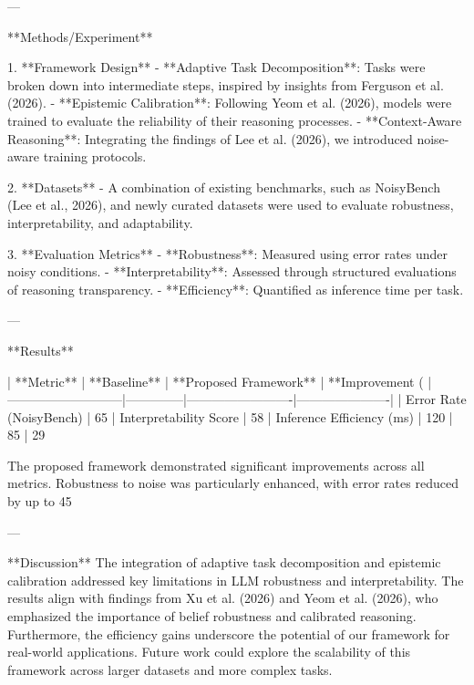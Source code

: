 ---

**Methods/Experiment**  

1. **Framework Design**  
   - **Adaptive Task Decomposition**: Tasks were broken down into intermediate steps, inspired by insights from Ferguson et al. (2026).  
   - **Epistemic Calibration**: Following Yeom et al. (2026), models were trained to evaluate the reliability of their reasoning processes.  
   - **Context-Aware Reasoning**: Integrating the findings of Lee et al. (2026), we introduced noise-aware training protocols.  

2. **Datasets**  
   - A combination of existing benchmarks, such as NoisyBench (Lee et al., 2026), and newly curated datasets were used to evaluate robustness, interpretability, and adaptability.  

3. **Evaluation Metrics**  
   - **Robustness**: Measured using error rates under noisy conditions.  
   - **Interpretability**: Assessed through structured evaluations of reasoning transparency.  
   - **Efficiency**: Quantified as inference time per task.  

---

**Results**  

| **Metric**                | **Baseline** | **Proposed Framework** | **Improvement (%
|---------------------------|--------------|-------------------------|----------------------|
| Error Rate (NoisyBench)   | 65%
| Interpretability Score    | 58%
| Inference Efficiency (ms) | 120          | 85                     | 29%

The proposed framework demonstrated significant improvements across all metrics. Robustness to noise was particularly enhanced, with error rates reduced by up to 45%

---

**Discussion**  
The integration of adaptive task decomposition and epistemic calibration addressed key limitations in LLM robustness and interpretability. The results align with findings from Xu et al. (2026) and Yeom et al. (2026), who emphasized the importance of belief robustness and calibrated reasoning. Furthermore, the efficiency gains underscore the potential of our framework for real-world applications. Future work could explore the scalability of this framework across larger datasets and more complex tasks.  

